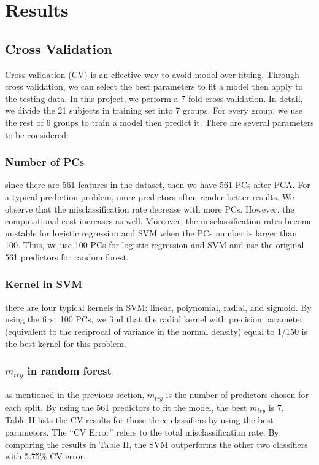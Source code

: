 \documentclass[conference]{IEEEtran}
\begin{document}
\section{Results}
\subsection{Cross Validation}
Cross validation (CV) is an effective way to avoid model over-fitting. Through cross validation, we can select the best parameters to fit a model then apply to the testing data. In this project, we perform a 7-fold cross validation. In detail, we divide the 21 subjects in training set into 7 groups. For every group, we use the rest of 6 groups to train a model then predict it. There are several parameters to be considered:

\subsubsection{Number of PCs}
since there are 561 features in the dataset, then we have 561 PCs after PCA. For a typical prediction problem, more predictors often render better results. We observe that the misclassification rate decrease with more PCs. However, the computational cost increases as well. Moreover, the misclassification rates become unstable for logistic regression and SVM when the PCs number is larger than 100. Thus, we use 100 PCs for logistic regression and SVM and use the original 561 predictors for random forest.
\subsubsection{Kernel in SVM}
there are four typical kernels in SVM: linear, polynomial, radial, and sigmoid. By using the first 100 PCs, we find that the radial kernel with precision parameter (equivalent to the reciprocal of variance in the normal density) equal to 1/150 is the best kernel for this problem.
\subsubsection{$m_{try}$ in random forest}
  as mentioned in the previous section, $m_{try}$ is the number of predictors chosen for each split. By using the 561 predictors to fit the model, the best $m_{try}$ is 7.\\


Table II lists the CV results for those three classifiers by using the best parameters. The ``CV Error'' refers to the total misclassification rate. By comparing the results in Table II, the SVM outperforms the other two classifiers with 5.75$\%$ CV error.
\end{document}
